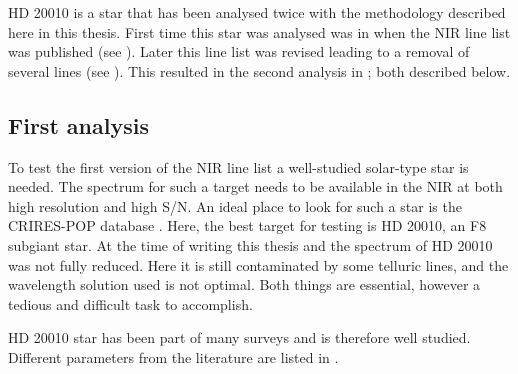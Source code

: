 HD 20010 is a star that has been analysed twice with the methodology described here in this thesis.
First time this star was analysed was in \citet{Andreasen2016} when the NIR line list was published
(see ). Later this line list was revised leading to a removal of several
lines (see ). This resulted in the second analysis in
\citet{Andreasen2017b}; both described below.

\subsection{First analysis}
\label{sec:HD20010_first}

To test the first version of the NIR line list a well-studied solar-type star is needed. The
spectrum for such a target needs to be available in the NIR at both high resolution and high S/N. An
ideal place to look for such a star is the CRIRES-POP database \citep{Lebzelter2012}. Here, the best
target for testing is HD 20010, an F8 subgiant star. At the time of writing this thesis and
\citet{Andreasen2016} the spectrum of HD 20010 was not fully reduced. Here it is still contaminated
by some telluric lines, and the wavelength solution used is not optimal. Both things are essential,
however a tedious and difficult task to accomplish.

HD 20010 star has been part of many surveys and is therefore well studied. Different parameters from
the literature are listed in .

